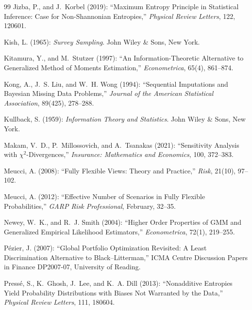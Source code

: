 \documentclass[11pt]{article}
\begin{document}
\begin{thebibliography}{99}
Jizba, P., and J.~Korbel (2019): ``Maximum Entropy Principle in Statistical
Inference: Case for Non-Shannonian Entropies,'' \textit{Physical Review
Letters}, 122, 120601.

Kish, L. (1965): \textit{Survey Sampling}. John Wiley \& Sons, New York.

Kitamura, Y., and M.~Stutzer (1997): ``An Information-Theoretic Alternative to
Generalized Method of Moments Estimation,'' \textit{Econometrica}, 65(4),
861--874.

Kong, A., J.~S. Liu, and W.~H. Wong (1994): ``Sequential Imputations and
Bayesian Missing Data Problems,'' \textit{Journal of the American
Statistical Association}, 89(425), 278--288.

Kullback, S. (1959): \textit{Information Theory and Statistics}. John
Wiley \& Sons, New York.

Makam, V.~D., P.~Millossovich, and A.~Tsanakas (2021): ``Sensitivity Analysis
with $\chi^2$-Divergences,'' \textit{Insurance: Mathematics and Economics},
100, 372--383.

Meucci, A. (2008): ``Fully Flexible Views: Theory and Practice,''
\textit{Risk}, 21(10), 97--102.

Meucci, A. (2012): ``Effective Number of Scenarios in Fully Flexible
Probabilities,'' \textit{GARP Risk Professional}, February, 32--35.

Newey, W.~K., and R.~J. Smith (2004): ``Higher Order Properties of GMM and
Generalized Empirical Likelihood Estimators,'' \textit{Econometrica},
72(1), 219--255.

P\'ezier, J. (2007): ``Global Portfolio Optimization Revisited: A Least
Discrimination Alternative to Black--Litterman,'' ICMA Centre Discussion
Papers in Finance DP2007-07, University of Reading.

Press\'e, S., K.~Ghosh, J.~Lee, and K.~A. Dill (2013): ``Nonadditive Entropies
Yield Probability Distributions with Biases Not Warranted by the Data,''
\textit{Physical Review Letters}, 111, 180604.


\end{thebibliography}
\end{document}
